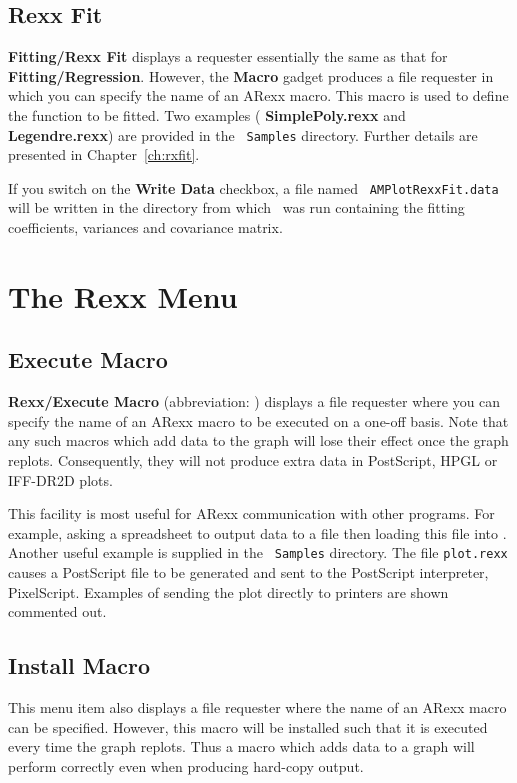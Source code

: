 \subsection{Rexx Fit}
{\bf Fitting/Rexx Fit}  displays a requester essentially the 
same as that for {\bf 
Fitting/Regression}. However, the {\bf Macro} gadget produces a file 
requester in which you can specify the name of an ARexx macro. This macro 
is used to define the function to be fitted. Two examples ({\bf 
SimplePoly.rexx} and {\bf Legendre.rexx}) are provided in the {\tt 
Samples} directory. Further details are presented in 
Chapter~\ref{ch:rxfit}.

If you switch on the {\bf Write Data} checkbox, a file named {\tt
AMPlotRexxFit.data} will be written in the directory from which \amplot\ 
was run containing the fitting coefficients, variances and covariance 
matrix.


\section{The Rexx Menu}

\subsection{Execute Macro}
{\bf Rexx/Execute Macro} (abbreviation: ) displays a file 
requester where you can specify the name 
of an ARexx macro to be executed on a one-off basis. Note that any such 
macros which add data to the graph will lose their effect once the graph 
replots. Consequently, they will not produce extra data in PostScript, 
HPGL or IFF-DR2D plots.

This facility is most useful for ARexx communication with other programs. 
For example, asking a spreadsheet to output data to a file then loading 
this file into \amplot. Another useful example is supplied in the {\tt 
Samples} directory. The file {\tt plot.rexx} causes a PostScript file to 
be generated and sent to the PostScript interpreter, PixelScript. Examples of 
sending the plot directly to printers are shown commented out.

\subsection{Install Macro}
This menu item also displays a file requester where the name of an ARexx 
macro can be specified. However, this macro will be installed such that 
it is executed every time the graph replots. Thus a macro which adds data 
to a graph will perform correctly even when producing hard-copy output.

